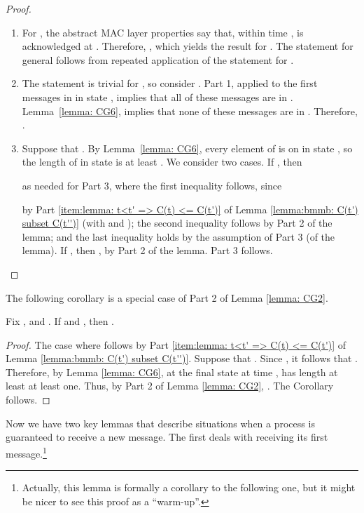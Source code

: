 \begin{proof}
\begin{enumerate}
\item
For ,
the abstract MAC layer properties say that, within
time ,  is acknowledged at .
Therefore, , which yields the result for .
The statement for general  follows from repeated application of the
statement for .
\item
The statement is trivial for , so consider .
Part 1, applied to the first  messages in  in state ,
implies that all of these messages are in .
Lemma~\ref{lemma: CG6},
implies that none of these messages
are in .
Therefore, .
\item
Suppose that  .
By Lemma~\ref{lemma: CG6}, every element of  is on
 in state , so the length of  in state  is
at least .
We consider two cases. If , then

as needed for Part 3, where the first inequality follows, since

by
Part \ref{item:lemma: t<t' => C(t) <= C(t')}
of Lemma \ref{lemma:bmmb: C(t') subset C(t'')}
(with  and );
the second inequality follows by Part 2 of the lemma;
and the last inequality holds by the assumption of Part 3 (of the lemma).
If , then
, by Part 2 of the lemma.
Part 3 follows.
\end{enumerate}
\end{proof}


The following corollary is a special case of Part 2 of Lemma \ref{lemma:  CG2}.



\begin{corollary}
\label{lemma:bmmb: ack and prog progress}
\label{coro:bmmb: ack and prog progress}
Fix ,  and .
If  and , then .
\end{corollary}
\begin{proof}
The case where  follows
by Part \ref{item:lemma: t<t' => C(t) <= C(t')}
of Lemma \ref{lemma:bmmb: C(t') subset C(t'')}.
Suppose that .
Since , it follows that .
Therefore,
by
Lemma \ref{lemma: CG6},
at the final state  at time ,  has length at least at least one.
Thus, by Part 2 of Lemma \ref{lemma:  CG2}, .
The Corollary follows.
\end{proof}




Now we have two key lemmas that describe situations when a process 
is guaranteed to receive a new message.
The first deals with  receiving its first message.\footnote{
  Actually, this lemma is formally a corollary to the following one,
  but it might be nicer to see this proof as a ``warm-up''.
  }


